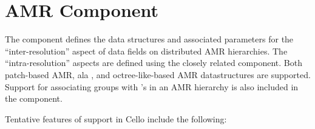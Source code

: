\section{AMR Component} \label{s:component-amr}

The  component defines the data structures and associated
parameters for the ``inter-resolution'' aspect of data fields on
distributed AMR hierarchies.  The ``intra-resolution'' aspects are
defined using the closely related  component.  Both
patch-based AMR, ala \enzo, and octree-like-based AMR datastructures
are supported.  Support for associating  groups with
's in an AMR hierarchy is also included in the
 component.

Tentative features of  support in Cello include the following: 

